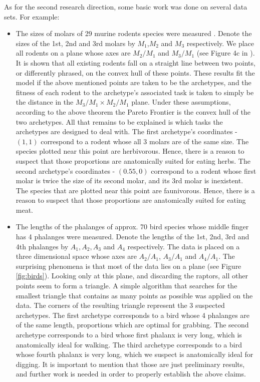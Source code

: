 \documentclass{article}
\theoremstyle{definition}
\theoremstyle{remark}
\begin{document}
As for the second research direction, some basic work was done on several data sets. For example:
\begin{itemize}
\item The sizes of molars of 29 murine rodents species were measured \cite{Teeth}. 
Denote the sizes of the 1st, 2nd and 3rd molars by $M_1$,$M_2$ and $M_3$ respectively. 
We place all rodents on a plane whose axes are $M_2/M_1$ and $M_3/M_1$ 
(see Figure 4c in \cite{Teeth}). 
It is shown that all existing rodents fall on a straight line between two points, 
or differently phrased, on the convex hull of these points. 
These results fit the model if the above mentioned points are taken to be the archetypes, 
and the fitness of each rodent to the archetype’s associated task is taken to simply be the distance 
in the $M_3/M_1 \times M_2/M_1$ plane. 
Under these assumptions, according to the above theorem the Pareto Frontier is the convex hull of the two archetypes. 
All that remains to be explained is which tasks the archetypes are designed to deal with. 
The first archetype's coordinates - $(1,1)$ correspond to a rodent whose all 3 molars are of the same size. 
The species plotted near this point are herbivorous. 
Hence, there is a reason to suspect that those proportions are anatomically suited for eating herbs. 
The second archetype's coordinates - $(0.55,0)$ 
correspond to a rodent whose first molar is twice the size of its second molar, 
and its 3rd molar is inexistent. 
The species that are plotted near this point are faunivorous. 
Hence, there is a reason to suspect that those proportions are anatomically suited for eating meat.
\item The lengths of the phalanges of approx. 70 bird species whose middle finger has 4 phalanges were measured. 
Denote the lengths of the 1st, 2nd, 3rd and 4th phalanges by 
$A_1,A_2,A_3$ and $A_4$ respectively. 
The data is placed on a three dimensional space whose axes are 
$A_2/A_1$, $A_3/A_1$ and $A_4/A_1$. 
The surprising phenomena is that most of the data lies on a plane (see Figure \ref{fig:birds}).
Looking only at this plane, and discarding the raptors, all other points seem to form a triangle. 
A simple algorithm that searches for the smallest triangle that contains as many points as possible 
was applied on the data. 
The corners of the resulting triangle represent the 3 suspected archetypes. 
The first archetype corresponds to a bird whose 4 phalanges are of the same length, 
proportions which are optimal for grabbing. 
The second archetype corresponds to a bird whose first phalanx is very long, 
which is anatomically ideal for walking. 
The third archetype corresponds to a bird whose fourth phalanx is very long, 
which we suspect is anatomically ideal for digging. 
It is important to mention that those are just preliminary results, and further work is needed in order to 
properly establish the above claims.
\end{itemize}
\end{document}
